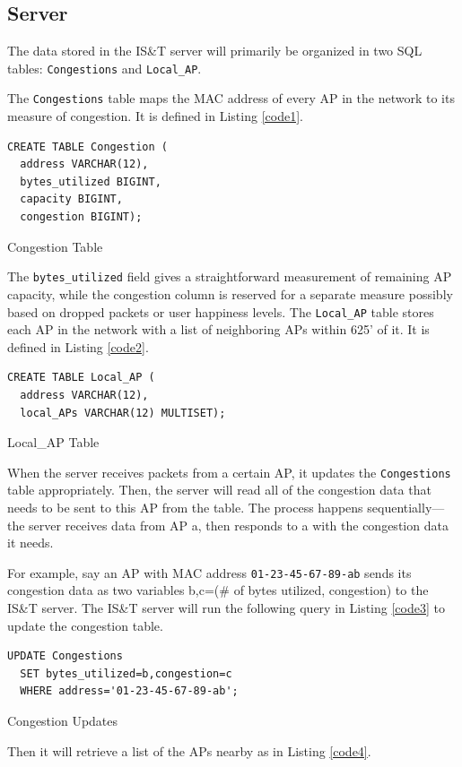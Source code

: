 \documentclass[journal]{IEEEtran}
\begin{document}
\subsection{Server}
The data stored in the IS\&T server will primarily be organized in two SQL tables:
\verb|Congestions| and \verb|Local_AP|.

The \verb|Congestions| table maps the MAC address of every AP in the network to its measure of congestion.
It is defined in Listing \ref{code1}.
 
\begin{listing}[H]
\begin{verbatim}
CREATE TABLE Congestion (
  address VARCHAR(12),
  bytes_utilized BIGINT,
  capacity BIGINT,
  congestion BIGINT);
\end{verbatim}
\caption{Congestion Table}
\label{code1}
\end{listing}
 
The \verb|bytes_utilized| field gives a straightforward measurement of remaining AP capacity, while the congestion column is reserved for a separate measure possibly based on dropped packets or user happiness levels. The \verb|Local_AP| table stores each AP in the network with a list of neighboring APs within 625' of it. It is defined in Listing \ref{code2}.
 
\begin{listing}[H]
\begin{verbatim}
CREATE TABLE Local_AP (
  address VARCHAR(12),
  local_APs VARCHAR(12) MULTISET);
\end{verbatim}
\caption{Local\_AP Table}
\label{code2}
\end{listing} 

When the server receives packets from a certain AP, it updates the \verb|Congestions| table appropriately. Then, the server will read all of the congestion data that needs to be sent to this AP from the table. The process happens sequentially—the server receives data from AP a, then responds to a with the congestion data it needs.
 
For example, say an AP with MAC address \verb|01-23-45-67-89-ab| sends its congestion data as two variables b,c=(\# of bytes utilized, congestion) to the IS\&T server. The IS\&T server will run the following query in Listing \ref{code3} to update the congestion table.
 
\begin{listing}[H]
\begin{verbatim}
UPDATE Congestions
  SET bytes_utilized=b,congestion=c
  WHERE address='01-23-45-67-89-ab';
\end{verbatim}
\caption{Congestion Updates}
\label{code3}
\end{listing}
Then it will retrieve a list of the APs nearby as in Listing \ref{code4}.
 
\end{document}
